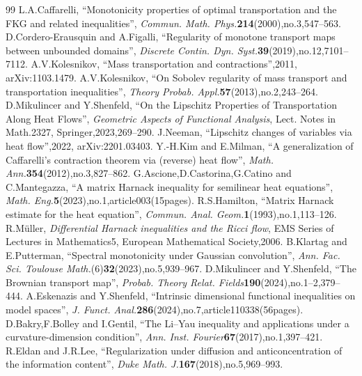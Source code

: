 \documentclass[10pt,a4paper]{amsart}
\theoremstyle{definition}\newtheorem{defi}[theo]{Definition}
\begin{document}
\begin{thebibliography}{99}
 L.A.Caffarelli, ``Monotonicity properties of optimal transportation and the FKG and related inequalities'', \emph{Commun. Math. Phys.}\textbf{214}(2000),no.3,547--563.
 D.Cordero-Erausquin and A.Figalli, ``Regularity of monotone transport maps between unbounded domains'', \emph{Discrete Contin. Dyn. Syst.}\textbf{39}(2019),no.12,7101--7112.
 A.V.Kolesnikov, ``Mass transportation and contractions'',2011, arXiv:1103.1479.
 A.V.Kolesnikov, ``On Sobolev regularity of mass transport and transportation inequalities'', \emph{Theory Probab. Appl.}\textbf{57}(2013),no.2,243--264.
 D.Mikulincer and Y.Shenfeld, ``On the Lipschitz Properties of Transportation Along Heat Flows'', \emph{Geometric Aspects of Functional Analysis}, Lect. Notes in Math.2327, Springer,2023,269--290.
 J.Neeman, ``Lipschitz changes of variables via heat flow'',2022, arXiv:2201.03403.
 Y.-H.Kim and E.Milman, ``A generalization of Caffarelli's contraction theorem via (reverse) heat flow'', \emph{Math. Ann.}\textbf{354}(2012),no.3,827--862.
 G.Ascione,D.Castorina,G.Catino and C.Mantegazza, ``A matrix Harnack inequality for semilinear heat equations'', \emph{Math. Eng.}\textbf{5}(2023),no.1,article003(15pages).
 R.S.Hamilton, ``Matrix Harnack estimate for the heat equation'', \emph{Commun. Anal. Geom.}\textbf{1}(1993),no.1,113--126.
 R.Müller, \emph{Differential Harnack inequalities and the Ricci flow}, EMS Series of Lectures in Mathematics5, European Mathematical Society,2006.
 B.Klartag and E.Putterman, ``Spectral monotonicity under Gaussian convolution'', \emph{Ann. Fac. Sci. Toulouse Math.}(6)\textbf{32}(2023),no.5,939--967.
 D.Mikulincer and Y.Shenfeld, ``The Brownian transport map'', \emph{Probab. Theory Relat. Fields}\textbf{190}(2024),no.1--2,379--444.
 A.Eskenazis and Y.Shenfeld, ``Intrinsic dimensional functional inequalities on model spaces'', \emph{J. Funct. Anal.}\textbf{286}(2024),no.7,article110338(56pages).
 D.Bakry,F.Bolley and I.Gentil, ``The Li--Yau inequality and applications under a curvature-dimension condition'', \emph{Ann. Inst. Fourier}\textbf{67}(2017),no.1,397--421.
 R.Eldan and J.R.Lee, ``Regularization under diffusion and anticoncentration of the information content'', \emph{Duke Math. J.}\textbf{167}(2018),no.5,969--993.

\end{thebibliography}
\end{document}
